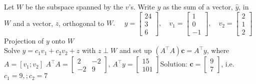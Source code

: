 \documentclass{article}
\begin{document}
\begin{multicols*}{2}
\footnotesize
Let $W$ be the subspace spanned by the $v$'s. Write $y$ as the sum of a vector, $\hat{y}$, in $W$ and a vector, $z$, orthogonal to $W.$
$\quad y = \begin{bmatrix} 24 \\ 3 \\ 6 \end{bmatrix}, \quad v_1 = \begin{bmatrix} 1 \\ 0 \\ -1 \end{bmatrix}, \quad v_2 = \begin{bmatrix} 2 \\ 1 \\ 2 \end{bmatrix}$
Projection of $y$ onto $W$
\\Solve $y=c_1v_1+c_2v_2+z$ with $z\perp W$ and set up $(A^\top A)\mathbf{c}=A^\top y$, where $A=[v_1;v_2]$
$A^\top A=\begin{bmatrix}2 & -2\\-2 & 9\end{bmatrix},\, A^\top y=\begin{bmatrix}15\\101\end{bmatrix} $Solution: $\mathbf{c}=\begin{bmatrix}9\\7\end{bmatrix}$, i.e. $c_1=9,;c_2=7$

\end{multicols*}
\end{document}
